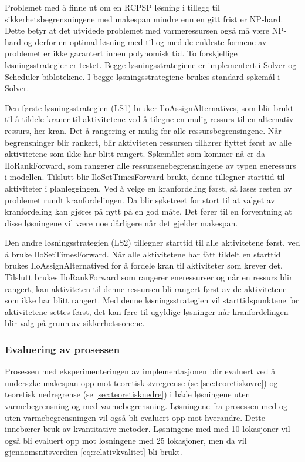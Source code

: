 Problemet med å finne ut om en RCPSP løsning i tillegg til sikkerhetsbegrensningene med makespan mindre enn en gitt frist er NP-hard. Dette betyr at det utvidede problemet med varmeressursen også må være NP-hard og derfor en optimal løsning med til og med de enkleste formene av problemet er ikke garantert innen polynomisk tid. To forskjellige løsningsstrategier er testet. Begge løsningsstrategiene er implementert i Solver og Scheduler biblotekene. I begge løsningsstrategiene brukes standard søkemål i Solver.

Den første løsningsstrategien (LS1) bruker IloAssignAlternatives, som blir brukt til å tildele kraner til aktivitetene ved å tilegne en mulig ressurs til en alternativ ressurs, her kran. Det å rangering er mulig for alle ressursbegrensingene. Når begrensninger blir rankert, blir aktiviteten ressursen tilhører flyttet først av alle aktivitetene som ikke har blitt rangert. Søkemålet som kommer nå er da IloRankForward, som rangerer alle ressursenebegrensningene av typen eneressurs i modellen. Tilslutt blir IloSetTimesForward brukt, denne tillegner starttid til aktiviteter i planleggingen. Ved å velge en kranfordeling først, så løses resten av problemet rundt kranfordelingen. Da blir søketreet for stort til at valget av kranfordeling kan gjøres på nytt på en god måte. Det fører til en forventning at disse løsningene vil være noe dårligere når det gjelder makespan.

Den andre løsningsstrategien (LS2) tillegner starttid til alle aktivitetene først, ved å bruke IloSetTimesForward. Når alle aktivitetene har fått tildelt en starttid brukes IloAssignAlternatived for å fordele kran til aktiviteter som krever det. Tilslutt brukes IloRankForward som rangerer eneressurser og når en ressurs blir rangert, kan aktiviteten til denne ressursen bli rangert først av de aktivitetene som ikke har blitt rangert. Med denne løsningsstrategien vil starttidspunktene for aktivitetene settes først, det kan føre til ugyldige løsninger når kranfordelingen blir valg på grunn av sikkerhetssonene.

\subsubsection{Evaluering av prosessen}
Prosessen med eksperimenteringen av implementasjonen blir evaluert ved å undersøke makespan opp mot teoretisk øvregrense (se \ref{sec:teoretiskovre}) og teoretisk nedregrense (se \ref{sec:teoretisknedre}) i både løsningene uten varmebegrensning og med varmebegrensning. Løsningene fra prosessen med og uten varmebegrensningen vil også bli evaluert opp mot hverandre. Dette innebærer bruk av kvantitative metoder. Løsningene med med 10 lokasjoner vil også bli evaluert opp mot løsningene med 25 lokasjoner, men da vil gjennomsnitsverdien \ref{eq:relativkvalitet} bli brukt.

